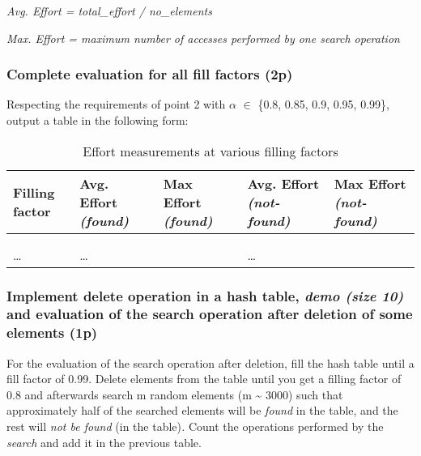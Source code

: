 \documentclass[../en-fa-lab.tex]{subfiles}
\begin{document}
\emph{Avg. Effort = total\_effort / no\_elements}

\emph{Max. Effort = maximum number of accesses performed by one search
operation}

\subsubsection{Complete evaluation for all fill factors
(2p)}\label{complete-evaluation-for-all-fill-factors-2p}

Respecting the requirements of point 2 with \emph{$\alpha$} $\in$ \{0.8, 0.85, 0.9, 0.95, 0.99\}, output a table in the following form:

\begin{table}[ht]
  \centering
  \caption{Effort measurements at various filling factors}
  \label{tbl:effort-vs-filling-extended}
  \begin{tabularx}{\textwidth}{%
      >{\centering\arraybackslash}X
      >{\centering\arraybackslash}X
      >{\centering\arraybackslash}X
      >{\centering\arraybackslash}X
      >{\centering\arraybackslash}X
    }
    \toprule
    \textbf{Filling factor}
      & \textbf{Avg. Effort \emph{(found)}}
      & \textbf{Max Effort \emph{(found)}}
      & \textbf{Avg. Effort \emph{(not-found)}}
      & \textbf{Max Effort \emph{(not-found)}} \\
    \midrule
    0.80  &     &     &     &     \\
    0.85  &     &     &     &     \\
    …     & …   &     & …   &     \\
    \bottomrule
  \end{tabularx}
\end{table}

\subsubsection{\texorpdfstring{Implement delete operation in a hash table,
\emph{demo (size 10)} and evaluation of the search operation after
deletion of some elements
(1p)}{Implement delete operation in a hash table, demo (size 10) and evaluation of the search operation after deletion of some elements (1p)}}\label{implement-delete-operation-in-a-hash-table-demo-size-10-and-evaluation-of-the-search-operation-after-deletion-of-some-elements-1p}

For the evaluation of the search operation after deletion, fill the hash
table until a fill factor of 0.99. Delete elements from the table until
you get a filling factor of 0.8 and afterwards search m random elements
(m \textasciitilde{} 3000) such that approximately half of the searched
elements will be \emph{found} in the table, and the rest will \emph{not
be found} (in the table)\emph{.} Count the operations performed by the
\emph{search} and add it in the previous table.
\end{document}
